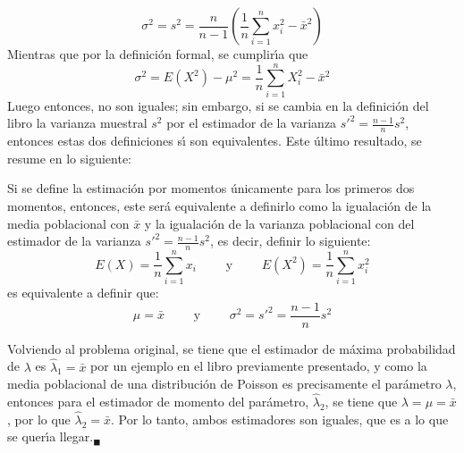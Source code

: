 \begin{solucion}
\begin{equation*}
  \sigma^2 = s^2 = \frac{n}{n-1}\left( \frac{1}{n}\sum_{i=1}^n x_i^2 - \bar{x}^2 \right)
 \end{equation*}
 Mientras que por la definici\'on formal, se cumplir\'{\i}a que
 \begin{equation*}
  \sigma^2 = E\left( X^2 \right) - \mu^2 = \frac{1}{n}\sum_{i=1}^n X_i^2 - \bar{x}^2
 \end{equation*}
 Luego entonces, no son iguales; sin embargo, si se cambia en la definici\'on del libro la varianza muestral $s^2$ por el estimador de la varianza $s'^2 = \frac{n-1}{n}s^2$, entonces estas dos definiciones s\'{\i} son equivalentes. Este \'ultimo resultado, se resume en lo siguiente:
 \begin{lema}
  Si se define la estimaci\'on por momentos \'unicamente para los primeros dos momentos, entonces, este ser\'a equivalente a definirlo como la igualaci\'on de la media poblacional con $\bar{x}$ y la igualaci\'on de la varianza poblacional con del estimador de la varianza $s'^2 = \frac{n-1}{n}s^2$, es decir, definir lo siguiente:
  \begin{equation*}
   E(X) = \frac{1}{n} \sum_{i=1}^n x_i \qquad \text{ y } \qquad E\left( X^2 \right) = \frac{1}{n} \sum_{i=1}^n x_i^2
  \end{equation*}
  es equivalente a definir que:
  \begin{equation*}
   \mu = \bar{x} \qquad \text{ y } \qquad \sigma^2 = s'^2 = \frac{n-1}{n} s^2
  \end{equation*}
 \end{lema}
 Volviendo al problema original, se tiene que el estimador de m\'axima probabilidad de $\lambda$ es $\widehat{\lambda}_1 = \bar{x}$ por un ejemplo en el libro previamente presentado, y como la media poblacional de una distribuci\'on de Poisson es precisamente el par\'ametro $\lambda$, entonces para el estimador de momento del par\'ametro, $\widehat{\lambda}_2$, se tiene que $\lambda = \mu = \bar{x}$, por lo que $\widehat{\lambda}_2 = \bar{x}$. Por lo tanto, ambos estimadores son iguales, que es a lo que se quer\'{\i}a llegar.${}_{\blacksquare}$
\end{solucion}
